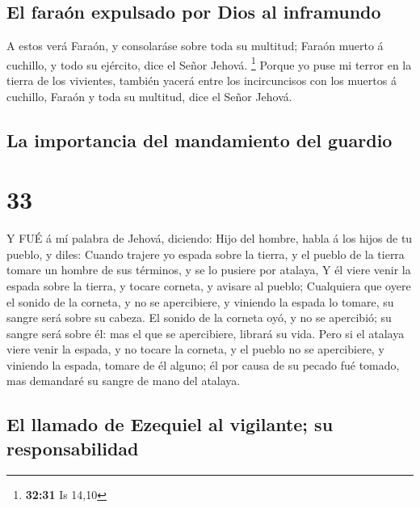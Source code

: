 \hypertarget{el-farauxf3n-expulsado-por-dios-al-inframundo}{%
\subsection{El faraón expulsado por Dios al
inframundo}\label{el-farauxf3n-expulsado-por-dios-al-inframundo}}

 A estos verá Faraón, y consolaráse sobre toda su multitud;
Faraón muerto á cuchillo, y todo su ejército, dice el Señor Jehová.
\footnote{\textbf{32:31} Is 14,10}  Porque yo puse mi
terror en la tierra de los vivientes, también yacerá entre los
incircuncisos con los muertos á cuchillo, Faraón y toda su multitud,
dice el Señor Jehová.

\hypertarget{la-importancia-del-mandamiento-del-guardio}{%
\subsection{La importancia del mandamiento del
guardio}\label{la-importancia-del-mandamiento-del-guardio}}

\hypertarget{section-32}{%
\section{33}\label{section-32}}

 Y FUÉ á mí palabra de Jehová, diciendo:  Hijo
del hombre, habla á los hijos de tu pueblo, y diles: Cuando trajere yo
espada sobre la tierra, y el pueblo de la tierra tomare un hombre de sus
términos, y se lo pusiere por atalaya,  Y él viere venir la
espada sobre la tierra, y tocare corneta, y avisare al pueblo;
 Cualquiera que oyere el sonido de la corneta, y no se
apercibiere, y viniendo la espada lo tomare, su sangre será sobre su
cabeza.  El sonido de la corneta oyó, y no se apercibió; su
sangre será sobre él: mas el que se apercibiere, librará su vida.
 Pero si el atalaya viere venir la espada, y no tocare la
corneta, y el pueblo no se apercibiere, y viniendo la espada, tomare de
él alguno; él por causa de su pecado fué tomado, mas demandaré su sangre
de mano del atalaya.

\hypertarget{el-llamado-de-ezequiel-al-vigilante-su-responsabilidad}{%
\subsection{El llamado de Ezequiel al vigilante; su
responsabilidad}\label{el-llamado-de-ezequiel-al-vigilante-su-responsabilidad}}

